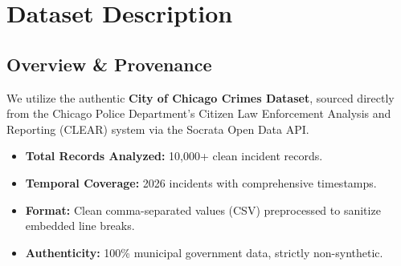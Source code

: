 \documentclass[12pt, a4paper]{article}
\begin{document}
\section{Dataset Description}
\subsection{Overview \& Provenance}
We utilize the authentic \textbf{City of Chicago Crimes Dataset}, sourced directly from the Chicago Police Department's Citizen Law Enforcement Analysis and Reporting (CLEAR) system via the Socrata Open Data API.
\begin{itemize}
    \item \textbf{Total Records Analyzed:} 10,000+ clean incident records.
    \item \textbf{Temporal Coverage:} 2026 incidents with comprehensive timestamps.
    \item \textbf{Format:} Clean comma-separated values (CSV) preprocessed to sanitize embedded line breaks.
    \item \textbf{Authenticity:} 100\% municipal government data, strictly non-synthetic.
\end{itemize}
\end{document}
